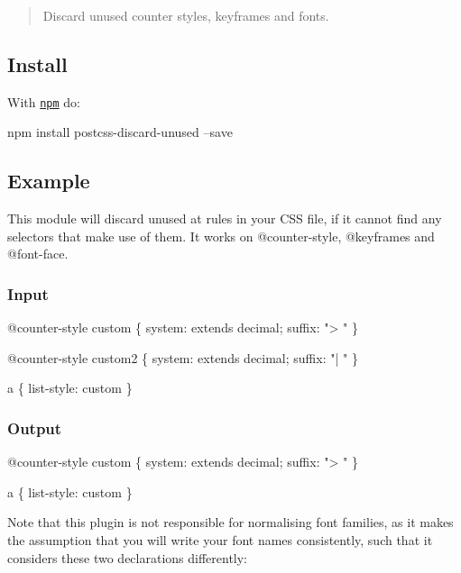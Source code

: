 \begin{quote}
Discard unused counter styles, keyframes and fonts. \end{quote}


\subsection*{Install}

With \href{https://npmjs.org/package/postcss-discard-unused}{\tt npm} do\+:


\begin{DoxyCode}
npm install postcss-discard-unused --save
\end{DoxyCode}


\subsection*{Example}

This module will discard unused at rules in your C\+SS file, if it cannot find any selectors that make use of them. It works on {\ttfamily @counter-\/style}, {\ttfamily @keyframes} and {\ttfamily @font-\/face}.

\subsubsection*{Input}


\begin{DoxyCode}
@counter-style custom \{
    system: extends decimal;
    suffix: "> "
\}

@counter-style custom2 \{
    system: extends decimal;
    suffix: "| "
\}

a \{
    list-style: custom
\}
\end{DoxyCode}


\subsubsection*{Output}


\begin{DoxyCode}
@counter-style custom \{
    system: extends decimal;
    suffix: "> "
\}

a \{
    list-style: custom
\}
\end{DoxyCode}


Note that this plugin is not responsible for normalising font families, as it makes the assumption that you will write your font names consistently, such that it considers these two declarations differently\+:


